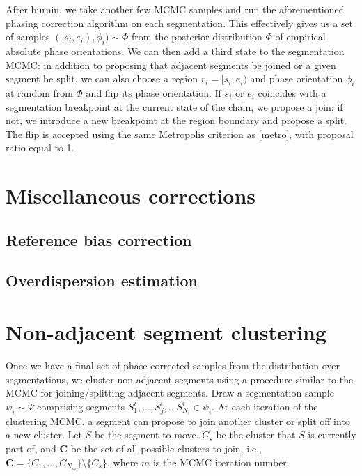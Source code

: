 \documentclass[10pt,letter]{article}
\numberwithin{equation}{section}
\begin{document}
After burnin, we take another few MCMC samples and run the aforementioned phasing correction algorithm on each segmentation. This effectively gives us a set of samples $([s_i,e_i),\phi_i)\sim\Phi$ from the posterior distribution $\Phi$ of empirical absolute phase orientations. We can then add a third state to the segmentation MCMC: in addition to proposing that adjacent segments be joined or a given segment be split, we can also choose a region $r_i=[s_i,e_i)$ and phase orientation $\phi_i$ at random from $\Phi$ and flip its phase orientation. If $s_i$ or $e_i$ coincides with a segmentation breakpoint at the current state of the chain, we propose a join; if not, we introduce a new breakpoint at the region boundary and propose a split. The flip is accepted using the same Metropolis criterion as \eqref{metro}, with proposal ratio equal to 1.

\section{Miscellaneous corrections}

\subsection{Reference bias correction}

\subsection{Overdispersion estimation}



\section{Non-adjacent segment clustering}

Once we have a final set of phase-corrected samples from the distribution over segmentations, we cluster non-adjacent segments using a procedure similar to the MCMC for joining/splitting adjacent segments. Draw a segmentation sample $\psi_i\sim\Psi$ comprising segments $S^i_1,\dots, S^i_j,\dots S^i_{N_i}\in \psi_i$. At each iteration of the clustering MCMC, a segment can propose to join another cluster or split off into a new cluster. Let $S$ be the segment to move, $C_s$ be the cluster that $S$ is currently part of, and $\mathbf C$ be the set of all possible clusters to join, i.e., $\mathbf{C} = \{C_1,\dots,C_{N_m}\}\setminus\{C_s\}$, where $m$ is the MCMC iteration number.
\end{document}
